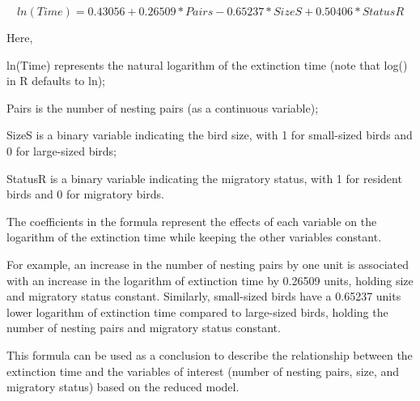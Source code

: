 \documentclass{article}
\begin{document}
$$ln(Time) = 0.43056 + 0.26509 * Pairs - 0.65237 * SizeS + 0.50406 *
StatusR$$

Here,

ln(Time) represents the natural logarithm of the extinction time (note
that log() in R defaults to ln);

Pairs is the number of nesting pairs (as a continuous variable);

SizeS is a binary variable indicating the bird size, with 1 for
small-sized birds and 0 for large-sized birds;

StatusR is a binary variable indicating the migratory status, with 1 for
resident birds and 0 for migratory birds.

The coefficients in the formula represent the effects of each variable
on the logarithm of the extinction time while keeping the other
variables constant.

For example, an increase in the number of nesting pairs by one unit is
associated with an increase in the logarithm of extinction time by
0.26509 units, holding size and migratory status constant. Similarly,
small-sized birds have a 0.65237 units lower logarithm of extinction
time compared to large-sized birds, holding the number of nesting pairs
and migratory status constant.

This formula can be used as a conclusion to describe the relationship
between the extinction time and the variables of interest (number of
nesting pairs, size, and migratory status) based on the reduced model.
\end{document}
